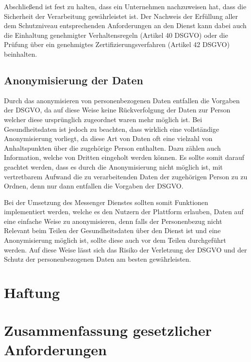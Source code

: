 Abschließend ist fest zu halten, dass ein Unternehmen nachzuweisen hat, dass die Sicherheit der Verarbeitung gewährleistet ist. 
Der Nachweis der Erfüllung aller dem Schutzniveau entsprechenden Anforderungen an den Dienst kann dabei auch die Einhaltung genehmigter Verhaltensregeln (Artikel 40 DSGVO) oder die Prüfung über ein genehmigtes Zertifizierungsverfahren (Artikel 42 DSGVO) beinhalten.

\subsection{Anonymisierung der Daten}\label{subsection:add}
Durch das anonymisieren von personenbezogenen Daten entfallen die Vorgaben der DSGVO, da auf diese Weise keine Rückverfolgung der Daten zur Person welcher diese ursprünglich zugeordnet waren mehr möglich ist. Bei Gesundheitsdaten ist jedoch zu beachten, dass wirklich eine vollständige Anonymisierung vorliegt, da diese Art von Daten oft eine vielzahl von Anhaltspunkten über die zugehörige Person enthalten. Dazu zählen auch Information, welche von Dritten eingeholt werden können. Es sollte somit darauf geachtet werden, dass es durch die Anonymisierung nicht möglich ist, mit vertretbarem Aufwand die zu verarbeitenden Daten der zugehörigen Person zu zu Ordnen, denn nur dann entfallen die Vorgaben der DSGVO. 

Bei der Umsetzung des Messenger Dienstes sollten somit Funktionen implementiert werden, welche es den Nutzern der Plattform erlauben, Daten auf eine einfache Weise zu anonymisieren, denn falls der Personenbezug nicht Relevant beim Teilen der Gesundheitsdaten über den Dienst ist und eine Anonymisierung möglich ist, sollte diese auch vor dem Teilen durchgeführt werden. Auf diese Weise lässt sich das Risiko der Verletzung der DSGVO und der Schutz der personenbezogenen Daten am besten gewährleisten.

\section{Haftung}\label{section:haftung}

\section{Zusammenfassung gesetzlicher Anforderungen}\label{section:zga}

